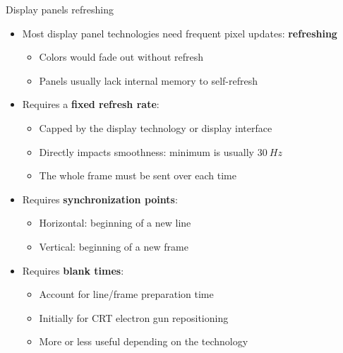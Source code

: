\begin{frame}{Display panels refreshing}
  \begin{itemize}
  \item Most display panel technologies need frequent pixel updates: \textbf{refreshing}
    \begin{itemize}
    \item Colors would fade out without refresh
    \item Panels usually lack internal memory to self-refresh
    \end{itemize}
  \item Requires a \textbf{fixed refresh rate}:
    \begin{itemize}
    \item Capped by the display technology or display interface
    \item Directly impacts smoothness: minimum is usually \(30~Hz\)
    \item The whole frame must be sent over each time
    \end{itemize}
  \item Requires \textbf{synchronization points}:
    \begin{itemize}
    \item Horizontal: beginning of a new line
    \item Vertical: beginning of a new frame
    \end{itemize}
  \item Requires \textbf{blank times}:
    \begin{itemize}
    \item Account for line/frame preparation time
    \item Initially for CRT electron gun repositioning
    \item More or less useful depending on the technology
    \end{itemize}
  \end{itemize}
\end{frame}

